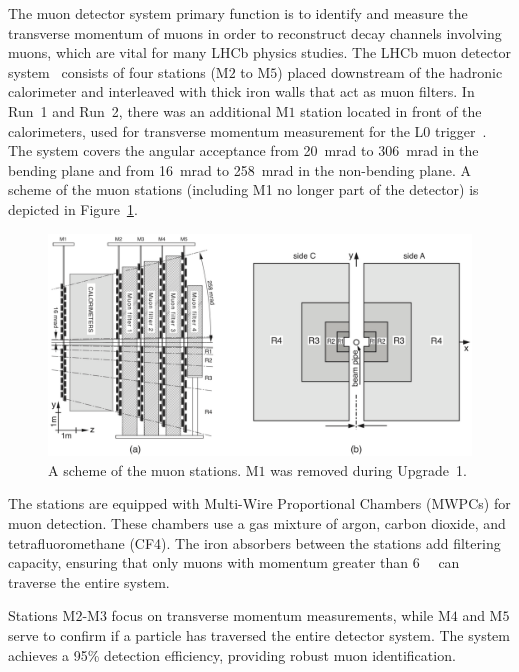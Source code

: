 The muon detector system primary function is to identify and measure the transverse momentum of muons in order to reconstruct decay channels involving muons, which are vital for many LHCb physics studies.
The LHCb muon detector system~\cite{Alves_2013} consists of four stations (M$2$ to M$5$) placed downstream of the hadronic calorimeter and interleaved with thick iron walls that act as muon filters. In Run~1 and Run~2, there was an additional M$1$ station located in front of the calorimeters, used for transverse momentum measurement for the L$0$ trigger~\cite{muon_upgrade}. The system covers the angular acceptance from \SI{20}{\milli\radian} to \SI{306}{\milli\radian} in the bending plane and from \SI{16}{\milli\radian} to \SI{258}{\milli\radian} in the non-bending plane. 
A scheme of the muon stations (including M1 no longer part of the detector) is depicted in Figure~\ref{fig:muon}.
\begin{figure}
    \centering
    \includegraphics[width=\textwidth]{figures/muon.png}
    \caption{A scheme of the muon stations. M$1$ was removed during Upgrade~1.}
    \label{fig:muon}
\end{figure}
The stations are equipped with Multi-Wire Proportional Chambers (MWPCs) for muon detection. These chambers use a gas mixture of argon, carbon dioxide, and tetrafluoromethane (CF4). The iron absorbers between the stations add filtering capacity, ensuring that only muons with momentum greater than \SI[per-mode=symbol]{6}{\giga\eVperc} can traverse the entire system.

Stations M$2$-M$3$ focus on transverse momentum measurements, while M$4$ and M$5$ serve to confirm if a particle has traversed the entire detector system. The system achieves a 95\% detection efficiency, providing robust muon identification. 

